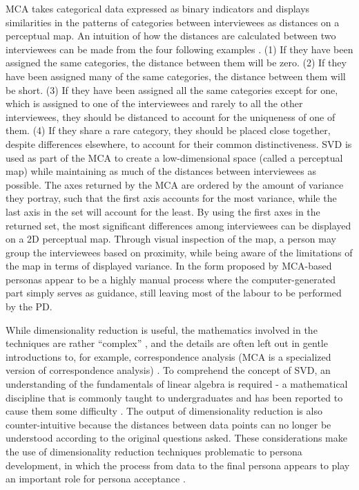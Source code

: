 MCA takes categorical data expressed as binary indicators and displays similarities in the patterns of categories between interviewees as distances on a perceptual map. An intuition of how the distances are calculated between two interviewees can be made from the four following examples \citep{Husson2011}. (1) If they have been assigned the same categories, the distance between them will be zero. (2) If they have been assigned many of the same categories, the distance between them will be short. (3) If they have been assigned all the same categories except for one, which is assigned to one of the interviewees and rarely to all the other interviewees, they should be distanced to account for the uniqueness of one of them. (4) If they share a rare category, they should be placed close together, despite differences elsewhere, to account for their common distinctiveness. SVD is used as part of the MCA to create a low-dimensional space (called a perceptual map) while maintaining as much of the distances between interviewees as possible. The axes returned by the MCA are ordered by the amount of variance they portray, such that the first axis accounts for the most variance, while the last axis in the set will account for the least. By using the first axes in the returned set, the most significant differences among interviewees can be displayed on a 2D perceptual map. Through visual inspection of the map, a person may group the interviewees based on proximity, while being aware of the limitations of the map in terms of displayed variance. In the form proposed by \cite{Laporte2012} MCA-based personas appear to be a highly manual process where the computer-generated part simply serves as guidance, still leaving most of the labour to be performed by the PD.

While dimensionality reduction is useful, the mathematics involved in the techniques are rather ``complex'' \citep{Sourial2010}, and the details are often left out in gentle introductions to, for example, correspondence analysis (MCA is a specialized version of correspondence analysis) \citep{Bock2017}. To comprehend the concept of SVD, an understanding of the fundamentals of linear algebra is required - a mathematical discipline that is commonly taught to undergraduates and has been reported to cause them some difficulty \citep{Grenier-Boley2014, Masters2000, Harel1987}. The output of dimensionality reduction is also counter-intuitive because the distances between data points can no longer be understood according to the original questions asked. These considerations make the use of dimensionality reduction techniques problematic to persona development, in which the process from data to the final persona appears to play an important role for persona acceptance \citep{Viana2016,Siegel2010}.

